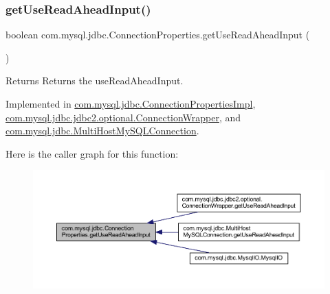 \subsubsection{\texorpdfstring{get\+Use\+Read\+Ahead\+Input()}{getUseReadAheadInput()}}
{\footnotesize\ttfamily boolean com.\+mysql.\+jdbc.\+Connection\+Properties.\+get\+Use\+Read\+Ahead\+Input (\begin{DoxyParamCaption}{ }\end{DoxyParamCaption})}

\begin{DoxyReturn}{Returns}
Returns the use\+Read\+Ahead\+Input. 
\end{DoxyReturn}


Implemented in \mbox{\hyperlink{classcom_1_1mysql_1_1jdbc_1_1_connection_properties_impl_a2369b4ad21bab11a20fa7c73b4f0fdb6}{com.\+mysql.\+jdbc.\+Connection\+Properties\+Impl}}, \mbox{\hyperlink{classcom_1_1mysql_1_1jdbc_1_1jdbc2_1_1optional_1_1_connection_wrapper_a4fa0114adf1b3a739082aafb7e016d47}{com.\+mysql.\+jdbc.\+jdbc2.\+optional.\+Connection\+Wrapper}}, and \mbox{\hyperlink{classcom_1_1mysql_1_1jdbc_1_1_multi_host_my_s_q_l_connection_a06e5584ec8ed2f0025af2929d47cfe34}{com.\+mysql.\+jdbc.\+Multi\+Host\+My\+S\+Q\+L\+Connection}}.

Here is the caller graph for this function\+:\nopagebreak
\begin{figure}[H]
\begin{center}
\leavevmode
\includegraphics[width=350pt]{interfacecom_1_1mysql_1_1jdbc_1_1_connection_properties_abad9605452003baa9e6841a990334c92_icgraph}
\end{center}
\end{figure}
\mbox{\label{interfacecom_1_1mysql_1_1jdbc_1_1_connection_properties_a399c463bcd4def7a8476647b2e09fd72}} 

